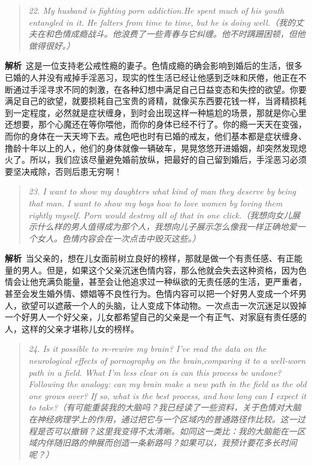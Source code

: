 \begin{quote}\it
    22. My husband is fighting porn addiction.He spent much of his youth entangled in it. He falters from time to time, but he is doing well.（我的丈夫在和色情成瘾战斗。他浪费了一些青春与它纠缠。他不时蹒跚困顿，但他做得很好。）
\end{quote}

\textbf{解析}\ 这是一位支持老公戒性瘾的妻子。色情成瘾的确会影响到婚后的生活，很多已婚的人并没有戒掉手淫恶习，现实的性生活已经让他感到乏味和厌倦，他正在不断通过手淫寻求不同的刺激，在各种幻想中满足自己日益变态和失控的欲望。你要满足自己的欲望，就要损耗自己宝贵的肾精，就像买东西要花钱一样，当肾精损耗到一定程度，必然就是症状缠身，到时会出现这样一种尴尬的场景，那就是你心里还想要，那个心魔还在等你喂他，而你的身体已经不行了。你的瘾一天天在变强，而你的身体在一天天垮下去。戒色吧也时有已婚的戒友，他们基本都是症状缠身、撸龄十年以上的人，他们的身体就像一辆破车，晃晃悠悠开进婚姻，却突然发现熄火了。所以，我们应该尽量避免婚前放纵，把最好的自己留到婚后，手淫恶习必须要坚决戒除，否则后患无穷啊！

\begin{quote}\it
    23. I want to show my daughters what kind of man they deserve by being that man. I want to show my boys how to love women by loving them rightly myself. Porn would destroy all of that in one click.（我想向女儿展示什么样的男人值得成为那个人，我想向儿子展示怎么像我一样正确地爱一个女人。色情内容会在一次点击中毁灭这些。）
\end{quote}

\textbf{解析}\ 当父亲的，想在儿女面前树立良好的榜样，那就是做一个有责任感、有正能量的男人。但是，如果这个父亲沉迷色情内容，那么他就会失去这种资格，因为色情会让他充满负能量，甚至会让他追求过一种纵欲的无责任感的生活，更严重者，甚至会发生婚外情、嫖娼等不良性行为。色情内容可以把一个好男人变成一个坏男人，欲望可以遮蔽一个人的头脑，让人变成下体动物。一次点击一次沉迷足以毁掉一个好男人一个好父亲，儿女都希望自己的父亲是一个有正气、对家庭有责任感的人，这样的父亲才堪称儿女的榜样。

\begin{quote}\it
    24. Is it possible to re-rewire my brain? I've read the data on the neurological effects of pornography on the brain,comparing it to a well-worn path in a field. What I'm less clear on is can this process be undone? Following the analogy: can my brain make a new path in the field as the old one grows over? If so, what is the best process, and how long can I expect it to take?（有可能重装我的大脑吗？我已经读了一些资料，关于色情对大脑在神经病理学上的作用，通过把它与一个区域内的普通路径作比较。这一过程是否可以撤销？这里我变得不太清晰。如同这一类比：我的大脑能在一区域内伴随旧路的伸展而创造一条新路吗？如果可以，我预计要花多长时间呢？）
\end{quote}

